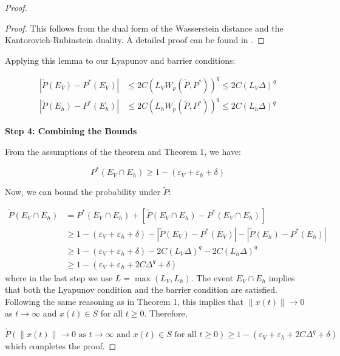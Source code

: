 \documentclass[11pt, oneside]{article}
\begin{document}
\begin{proof}
\begin{proof}
This follows from the dual form of the Wasserstein distance and the Kantorovich-Rubinstein duality. A detailed proof can be found in \cite{fournier2015rate}.
\end{proof}
%
Applying this lemma to our Lyapunov and barrier conditions:

\begin{align}
    |\tilde{P}(E_V) - P^*(E_V)| &\leq 2C(L_VW_p(\tilde{P},P^*))^q \leq 2C(L_V\Delta)^q \\
    |\tilde{P}(E_h) - P^*(E_h)| &\leq 2C(L_hW_p(\tilde{P},P^*))^q \leq 2C(L_h\Delta)^q
\end{align}

\textbf{Step 4: Combining the Bounds}

From the assumptions of the theorem and Theorem 1, we have:

\begin{equation}
    P^*(E_V \cap E_h) \geq 1 - (\varepsilon_V + \varepsilon_h + \delta)
\end{equation}

Now, we can bound the probability under $\tilde{P}$:

\begin{align}
    \tilde{P}(E_V \cap E_h) &= P^*(E_V \cap E_h) + [\tilde{P}(E_V \cap E_h) - P^*(E_V \cap E_h)] \\
    &\geq 1 - (\varepsilon_V + \varepsilon_h + \delta) - |\tilde{P}(E_V) - P^*(E_V)| - |\tilde{P}(E_h) - P^*(E_h)| \\
    &\geq 1 - (\varepsilon_V + \varepsilon_h + \delta) - 2C(L_V\Delta)^q - 2C(L_h\Delta)^q \\
    &\geq 1 - (\varepsilon_V + \varepsilon_h + 2C\Delta^q + \delta)
\end{align}
%
where in the last step we use $L = \max(L_V, L_h)$. The event $E_V \cap E_h$ implies that both the Lyapunov condition and the barrier condition are satisfied. Following the same reasoning as in Theorem 1, this implies that $\|x(t)\| \to 0$ as $t \to \infty$ and $x(t) \in S$ for all $t \geq 0$. Therefore,

\begin{equation}
    \tilde{P}(\|x(t)\| \to 0 \text{ as } t \to \infty \text{ and } x(t) \in S \text{ for all } t \geq 0) \geq 1 - (\varepsilon_V + \varepsilon_h + 2C\Delta^q + \delta)
\end{equation}
%
which completes the proof.
\end{proof}
\end{document}
